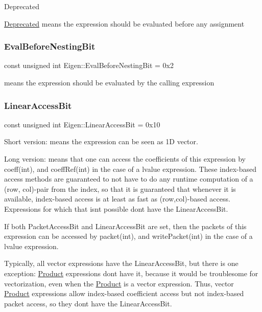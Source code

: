 \begin{DoxyRefDesc}{Deprecated}
\item[\mbox{\hyperlink{deprecated__deprecated000012}{Deprecated}}]means the expression should be evaluated before any assignment \end{DoxyRefDesc}
\mbox{\label{group__flags_gaa34e83bae46a8eeae4e69ebe3aaecbed}} 
\subsubsection{\texorpdfstring{EvalBeforeNestingBit}{EvalBeforeNestingBit}}
{\footnotesize\ttfamily const unsigned int Eigen\+::\+Eval\+Before\+Nesting\+Bit = 0x2}

means the expression should be evaluated by the calling expression \mbox{\label{group__flags_ga4b983a15d57cd55806df618ac544d09e}} 
\subsubsection{\texorpdfstring{LinearAccessBit}{LinearAccessBit}}
{\footnotesize\ttfamily const unsigned int Eigen\+::\+Linear\+Access\+Bit = 0x10}

Short version\+: means the expression can be seen as 1D vector.

Long version\+: means that one can access the coefficients of this expression by coeff(int), and coeff\+Ref(int) in the case of a lvalue expression. These index-\/based access methods are guaranteed to not have to do any runtime computation of a (row, col)-\/pair from the index, so that it is guaranteed that whenever it is available, index-\/based access is at least as fast as (row,col)-\/based access. Expressions for which that isn\textquotesingle{}t possible don\textquotesingle{}t have the Linear\+Access\+Bit.

If both Packet\+Access\+Bit and Linear\+Access\+Bit are set, then the packets of this expression can be accessed by packet(int), and write\+Packet(int) in the case of a lvalue expression.

Typically, all vector expressions have the Linear\+Access\+Bit, but there is one exception\+: \mbox{\hyperlink{class_eigen_1_1_product}{Product}} expressions don\textquotesingle{}t have it, because it would be troublesome for vectorization, even when the \mbox{\hyperlink{class_eigen_1_1_product}{Product}} is a vector expression. Thus, vector \mbox{\hyperlink{class_eigen_1_1_product}{Product}} expressions allow index-\/based coefficient access but not index-\/based packet access, so they don\textquotesingle{}t have the Linear\+Access\+Bit. \mbox{\label{group__flags_gae2c323957f20dfdc6cb8f44428eaec1a}} 
